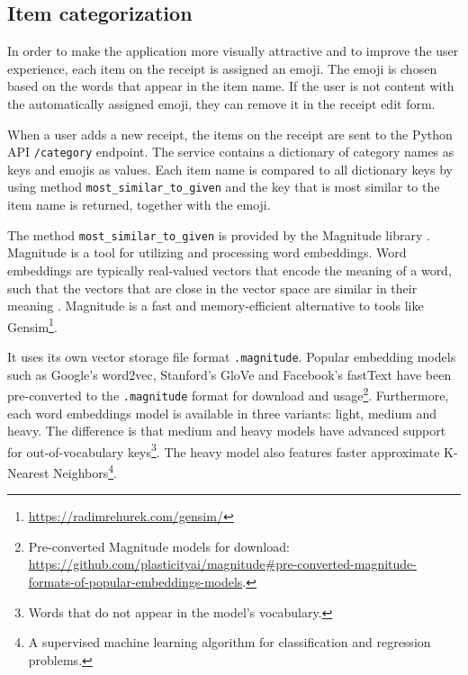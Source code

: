 \documentclass[
  digital, %
  table,   %
  oneside, %
  lof,     %
  lot,     %
]{fithesis3}
\DeclareRobustCommand{\thinskip}{\hskip 0.16667em\relax}
\def\emdash{---}
\def\dosh#1#2{\unskip#1\thinskip#2\thinskip\ignorespaces}
\def\Dash{\dosh\nobreak\emdash}
\begin{document}

\subsection{Item categorization}
In order to make the application more visually attractive and to improve the user experience, each item on the receipt is assigned an emoji. The emoji is chosen based on the words that appear in the item name. If the user is not content with the automatically assigned emoji, they can remove it in the receipt edit form.

When a user adds a new receipt, the items on the receipt are sent to the Python API \texttt{/category} endpoint. The service contains a dictionary of category names as keys and emojis as values. Each item name is compared to all dictionary keys by using method \texttt{most\_similar\_to\_given} and the key that is most similar to the item name is returned, together with the emoji.

The method \texttt{most\_similar\_to\_given} is provided by the Magnitude library \cite{PatelEtal2018Magnitude}. Magnitude is a tool for utilizing and processing word embeddings. Word embeddings are typically real-valued vectors that encode the meaning of a word, such that the vectors that are close in the vector space are similar in their meaning \cite{Jurafsky2020Speech}. Magnitude is a fast and memory-efficient alternative to tools like Gensim\footnote{\url{https://radimrehurek.com/gensim/}}.

It uses its own vector storage file format \texttt{.magnitude}.
Popular embedding models such as Google's word2vec, Stanford's GloVe and Facebook's fastText have been pre-converted to the \texttt{.magnitude} format for download and usage\footnote{Pre-converted Magnitude models for download:\\\url{https://github.com/plasticityai/magnitude\#pre-converted-magnitude-formats-of-popular-embeddings-models}.}. Furthermore, each word embeddings model is available in three variants: light, medium and heavy. The difference is that medium and heavy models have advanced support for out-of-vocabulary keys\footnote{Words that do not appear in the model's vocabulary.}. The heavy model also features faster approximate K-Nearest Neighbors\footnote{A supervised machine learning algorithm for classification and regression problems.}.
\end{document}
